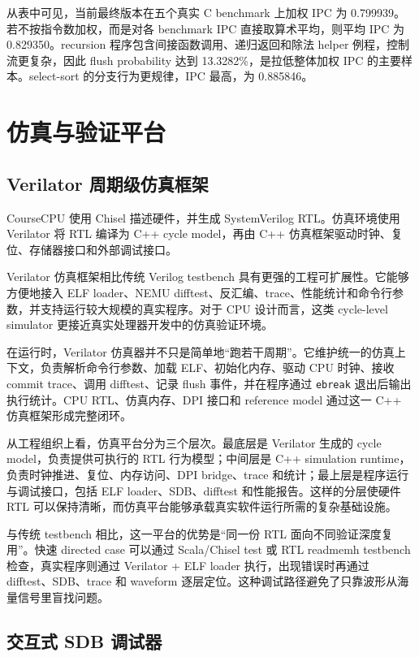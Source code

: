 \documentclass[UTF8,a4paper,12pt]{ctexrep}
\begin{document}
从表中可见，当前最终版本在五个真实 C benchmark 上加权 IPC 为 0.799939。若不按指令数加权，而是对各 benchmark IPC 直接取算术平均，则平均 IPC 为 0.829350。recursion 程序包含间接函数调用、递归返回和除法 helper 例程，控制流更复杂，因此 flush probability 达到 13.3282\%，是拉低整体加权 IPC 的主要样本。select-sort 的分支行为更规律，IPC 最高，为 0.885846。

\chapter{仿真与验证平台}

\section{Verilator 周期级仿真框架}

CourseCPU 使用 Chisel 描述硬件，并生成 SystemVerilog RTL。仿真环境使用 Verilator 将 RTL 编译为 C++ cycle model，再由 C++ 仿真框架驱动时钟、复位、存储器接口和外部调试接口。

Verilator 仿真框架相比传统 Verilog testbench 具有更强的工程可扩展性。它能够方便地接入 ELF loader、NEMU difftest、反汇编、trace、性能统计和命令行参数，并支持运行较大规模的真实程序。对于 CPU 设计而言，这类 cycle-level simulator 更接近真实处理器开发中的仿真验证环境。

在运行时，Verilator 仿真器并不只是简单地“跑若干周期”。它维护统一的仿真上下文，负责解析命令行参数、加载 ELF、初始化内存、驱动 CPU 时钟、接收 commit trace、调用 difftest、记录 flush 事件，并在程序通过 \texttt{ebreak} 退出后输出执行统计。CPU RTL、仿真内存、DPI 接口和 reference model 通过这一 C++ 仿真框架形成完整闭环。

从工程组织上看，仿真平台分为三个层次。最底层是 Verilator 生成的 cycle model，负责提供可执行的 RTL 行为模型；中间层是 C++ simulation runtime，负责时钟推进、复位、内存访问、DPI bridge、trace 和统计；最上层是程序运行与调试接口，包括 ELF loader、SDB、difftest 和性能报告。这样的分层使硬件 RTL 可以保持清晰，而仿真平台能够承载真实软件运行所需的复杂基础设施。

与传统 testbench 相比，这一平台的优势是“同一份 RTL 面向不同验证深度复用”。快速 directed case 可以通过 Scala/Chisel test 或 RTL readmemh testbench 检查，真实程序则通过 Verilator + ELF loader 执行，出现错误时再通过 difftest、SDB、trace 和 waveform 逐层定位。这种调试路径避免了只靠波形从海量信号里盲找问题。

\section{交互式 SDB 调试器}
\end{document}

